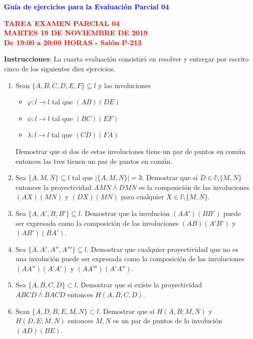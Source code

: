 \documentclass[12pt]{report}
\numberwithin{section}{chapter}
\begin{document}
\begin{center}
\textcolor{blue}{\textbf{\large Guía de ejercicios para la Evaluación Parcial 04}}
\end{center}

\begin{center}
\textcolor{red}{\textbf{\large TAREA EXAMEN PARCIAL 04\\
MARTES 19 DE NOVIEMBRE DE 2019\\
De 19:00 a 20:00 HORAS - Salón P-213}}
\vspace{0.5 cm}
\end{center}

\textbf{Instrucciones}: La cuarta evaluación consistirá en resolver y entregar por escrito cinco de los siguientes diez ejercicios.

\begin{enumerate}
\item Sean $\{A,B,C,D,E,F\}\subseteq l$ y las involuciones
\begin{itemize}
\item $\varphi: l\to l$ tal que $(AB)(DE)$
\item $\psi: l\to l$ tal que $(BC)(EF)$
\item $\lambda: l\to l$ tal que $(CD)(FA)$
\end{itemize}
Demostrar que si dos de estas involuciones tiene un par de puntos en común entonces las tres tienen un par de puntos en común.

\item Sea $\{A,M,N\}\subseteq l$ tal que $|\{A,M,N\}|=3$. Demostrar que si $D \in l \setminus\{M,N\}$ entonces la proyectividad $AMN \overline{\wedge} DMN$ es la composición de las involuciones $(AX)(MN)$ y $(DX)(MN)$ para cualquier $X \in l \setminus\{M,N\}$.

\item Sea $\{A,A',B,B'\}\subseteq l$. Demostrar que la involución $(AA')(BB')$ puede ser expresada como la composición de las involuciones $(AB)(A'B')$ y $(AB')(BA')$.

\item Sea $\{A,A',A'',A'''\}\subseteq l$. Demostrar que cualquier proyectividad que no es una involución puede ser expresada como la composición de las involuciones $(AA'')(A'A')$ y $(AA''')(A'A'')$.

\item Sea $\{A,B,C,D\} \subset l$. Demostrar que si existe la proyectividad $ABCD \overline{\wedge} BACD$ entonces $H(A,B; C,D)$.

\item Sean $\{A,D,B,E,M,N\}\subset l$. Demostrar que si $H(A,B; M,N)$ y $H(D,E;M,N)$ entonces $M,N$ es un par de puntos de la involución $(AD)(BE)$.


\end{enumerate}
\end{document}
